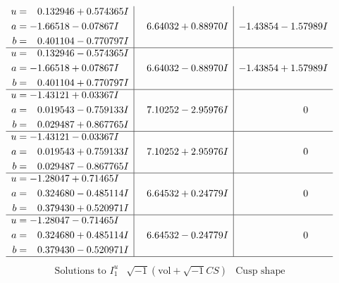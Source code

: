 \documentclass[1p]{elsarticle_modified}
\theoremstyle{definition}
\newcommand{\I}{\sqrt{-1}}
\begin{document}
$$\begin{array}{c|c|c}
\begin{aligned}
u &= \phantom{-}0.132946 + 0.574365 I \\
a &= -1.66518 - 0.07867 I \\
b &= \phantom{-}0.401104 - 0.770797 I\end{aligned}
 & \phantom{-}6.64032 + 0.88970 I & -1.43854 - 1.57989 I \\ \hline\begin{aligned}
u &= \phantom{-}0.132946 - 0.574365 I \\
a &= -1.66518 + 0.07867 I \\
b &= \phantom{-}0.401104 + 0.770797 I\end{aligned}
 & \phantom{-}6.64032 - 0.88970 I & -1.43854 + 1.57989 I \\ \hline\begin{aligned}
u &= -1.43121 + 0.03367 I \\
a &= \phantom{-}0.019543 - 0.759133 I \\
b &= \phantom{-}0.029487 + 0.867765 I\end{aligned}
 & \phantom{-}7.10252 - 2.95976 I & \phantom{-0.000000 } 0 \\ \hline\begin{aligned}
u &= -1.43121 - 0.03367 I \\
a &= \phantom{-}0.019543 + 0.759133 I \\
b &= \phantom{-}0.029487 - 0.867765 I\end{aligned}
 & \phantom{-}7.10252 + 2.95976 I & \phantom{-0.000000 } 0 \\ \hline\begin{aligned}
u &= -1.28047 + 0.71465 I \\
a &= \phantom{-}0.324680 - 0.485114 I \\
b &= \phantom{-}0.379430 + 0.520971 I\end{aligned}
 & \phantom{-}6.64532 + 0.24779 I & \phantom{-0.000000 } 0 \\ \hline\begin{aligned}
u &= -1.28047 - 0.71465 I \\
a &= \phantom{-}0.324680 + 0.485114 I \\
b &= \phantom{-}0.379430 - 0.520971 I\end{aligned}
 & \phantom{-}6.64532 - 0.24779 I & \phantom{-0.000000 } 0\\
 \hline 
 \end{array}$$\newpage$$\begin{array}{c|c|c}  
\text{Solutions to }I^u_{1}& \I (\text{vol} + \sqrt{-1}CS) & \text{Cusp shape}\\

\end{array}$$
\end{document}
